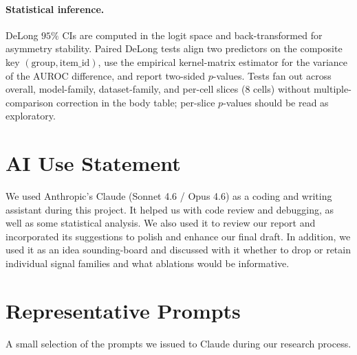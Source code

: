 \documentclass{article}
\begin{document}
\paragraph{Statistical inference.} DeLong $95\%$ CIs are computed in the
logit space and back-transformed for asymmetry stability. Paired DeLong
tests align two predictors on the composite key
$(\text{group}, \text{item\_id})$, use the empirical kernel-matrix
estimator for the variance of the AUROC difference, and report two-sided
$p$-values. Tests fan out across overall, model-family, dataset-family,
and per-cell slices ($8$ cells) without multiple-comparison correction in
the body table; per-slice $p$-values should be read as exploratory.

\section{AI Use Statement}
\label{app:ai}

We used Anthropic’s Claude (Sonnet 4.6 / Opus 4.6) as a coding and writing assistant during this project. It helped us with code review and debugging, as well as some statistical analysis. We also used it to review our report and incorporated its suggestions to polish and enhance our final draft. In addition, we used it as an idea sounding-board and discussed with it whether to drop or retain individual signal families and what ablations would be informative.

\section{Representative Prompts}
\label{app:prompts}

A small selection of the prompts we issued to Claude during our research process.
\end{document}
